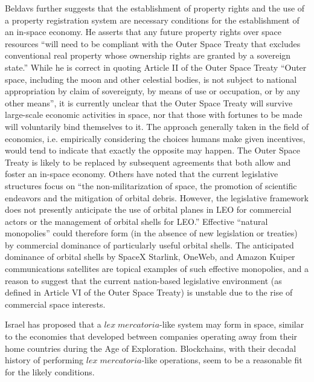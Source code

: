 \documentclass[journal ]{new-aiaa}
\begin{document}
Beldavs\cite{beldavs_blockchains_2016} further suggests that the establishment of property rights and the use of a property registration system are necessary conditions for the establishment of an in-space economy\cite{beldavs_blockchains_2016}. He asserts that any future property rights over space resources ``will need to be compliant with the Outer Space Treaty that excludes conventional real property whose ownership rights are granted by a sovereign state.'' While he is correct in quoting Article II of the Outer Space Treaty\cite{UNCPUOS_1967} ``Outer space, including the moon and other celestial bodies, is not subject to national appropriation by claim of sovereignty, by means of use or occupation, or by any other means'', it is currently unclear that the Outer Space Treaty will survive large-scale economic activities in space, nor that those with fortunes to be made will voluntarily bind themselves to it. The approach generally taken in the field of economics, i.e. empirically considering the choices humans make given incentives, would tend to indicate that exactly the opposite may happen. The Outer Space Treaty is likely to be replaced by subsequent agreements that both allow and foster an in-space economy. Others have noted that the current legislative structures focus on ``the non-militarization of space, the promotion of scientific endeavors and the mitigation of orbital debris. However, the legislative framework does not presently anticipate the use of orbital planes in LEO for commercial actors or the management of orbital shells for LEO.''\cite{green_mitigation_2018} Effective ``natural monopolies'' could therefore form (in the absence of new legislation or treaties) by commercial dominance of particularly useful orbital shells. The anticipated dominance of orbital shells by SpaceX Starlink, OneWeb, and Amazon Kuiper communications satellites are topical examples of such effective monopolies, and a reason to suggest that the current nation-based legislative environment (as defined in Article VI of the Outer Space Treaty\cite{UNCPUOS_1967}) is unstable due to the rise of commercial space interests.

Israel has proposed that a $\mathit{lex\; mercatoria}$-like system may form in space, similar to the economies that developed between companies operating away from their home countries during the Age of Exploration\cite{israel_space_2019}. Blockchains, with their decadal history of performing $\mathit{lex\; mercatoria}$-like operations, seem to be a reasonable fit for the likely conditions.
\end{document}
